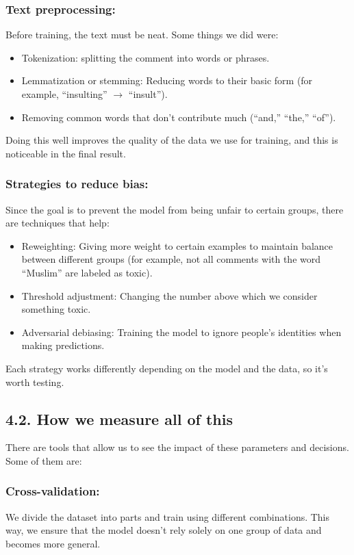 \documentclass[a4paper,12pt]{article}
\begin{document}
\subsubsection*{Text preprocessing:}
Before training, the text must be neat. Some things we did were:
\begin{itemize}
    \item Tokenization: splitting the comment into words or phrases.
    \item Lemmatization or stemming: Reducing words to their basic form (for example, “insulting” $\rightarrow$ “insult”).
    \item Removing common words that don't contribute much (“and,” “the,” “of”).
\end{itemize}
Doing this well improves the quality of the data we use for training, and this is noticeable in the final result.

\subsubsection*{Strategies to reduce bias:}
Since the goal is to prevent the model from being unfair to certain groups, there are techniques that help:
\begin{itemize}
    \item Reweighting: Giving more weight to certain examples to maintain balance between different groups (for example, not all comments with the word “Muslim” are labeled as toxic).
    \item Threshold adjustment: Changing the number above which we consider something toxic.
    \item Adversarial debiasing: Training the model to ignore people's identities when making predictions.
\end{itemize}
Each strategy works differently depending on the model and the data, so it's worth testing.

\subsection*{4.2. How we measure all of this}

There are tools that allow us to see the impact of these parameters and decisions. Some of them are:

\subsubsection*{Cross-validation:}
We divide the dataset into parts and train using different combinations. This way, we ensure that the model doesn't rely solely on one group of data and becomes more general.
\end{document}
